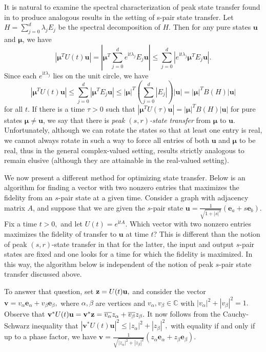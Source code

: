 \documentclass{article}
\numberwithin{equation}{section}
\newcommand{\be}{\mathbf e}
\newcommand{\bu}{\mathbf u}
\newcommand{\bv}{\mathbf v}
\newcommand{\bmu}{{\boldsymbol{\mu}}}
\def\C{\mathbb{C}}
\def\ii{\mathrm{i}}
\begin{document}
{It is natural to examine the spectral characterization of peak state transfer found in \cite{coutinho2019perfect} to produce analogous results in the setting of s-pair state transfer. Let %
$H =\sum_{j=0}^d\lambda_j E_j$ be the spectral decomposition of $H$. Then for any 
pure states $\bu$ and $\bmu$, we have 
\begin{equation*}
\left|\bmu^TU(t)\bu\right|= \left|\bmu^T\sum_{j=0}^de^{\ii t\lambda_j}E_j\bu\right|\leq \sum_{j=0}^d\left|e^{\ii t\lambda_j}\bmu^TE_j\bu\right|.
\end{equation*}
Since each $e^{\ii t\lambda_j}$ lies on the unit circle, we have 
\begin{equation*}
\left|\bmu^TU(t)\bu\right|\leq \sum_{j=0}^d\left|\bmu^TE_j\bu\right|\leq|\bmu|^T\left(\sum_{j=0}^d\left|E_j\right|\right)|\bu|=|\bmu|^TB(H)|\bu|
\end{equation*}
for all $t$. If there is a time $\tau>0$ such that  $|\bmu^TU(\tau)\bu|=|\bmu|^TB(H)|\bu|$ for pure states $\bmu\neq \bu$, we say that there is \emph{peak $(s,r)$-state transfer} from $\bmu$ to $\bu$. Unfortunately, although we can rotate the states so that at least one entry is real, we cannot always rotate in such a way to force all entries of both $\bu$ and $\bmu$ to be real, thus in the general complex-valued setting, results strictly analogous to \cite{coutinho2025peak} remain elusive (although they are attainable in the real-valued setting).  



We now present a different method for optimizing state transfer. Below is an algorithm for finding a vector with two nonzero entries that maximizes the fidelity from an $s$-pair state at a given time. 
Consider a graph with adjacency matrix $A$, and suppose that we are given the $s$-pair state $\bu= \frac{1}{\sqrt{1+|s|^2}}(\be_a+s\be_b)$. Fix a time $t>0,$ and let $U(t)=e^{\ii tA}.$ Which vector with two nonzero entries maximizes the fidelity of transfer to $\bu$ at time $t$? This is different than the notion of peak $(s,r)$-state transfer in that for the latter, the input and output $s$-pair states are fixed and one looks for a time for which the fidelity is maximized. In this way, the algorithm below is independent of the notion of peak $s$-pair state transfer discussed above. 

To answer that question, set ${\bf{z}}=U(t)\bu, $ and consider the vector $\bv=v_\alpha \be_\alpha +v_\beta \be_\beta,   $
where $\alpha, \beta$ are vertices and $v_\alpha, v_\beta \in \C$ with $|v_\alpha|^2+ |v_\beta|^2=1. $ Observe that $\bv^*U(t)\bu = \bv^* {\bf{z}} = \overline{v_\alpha} z_\alpha + \overline{v_\beta} z_\beta.  $ It now follows from the Cauchy-Schwarz inequality that $|\bv^*U(t)\bu|^2 \le |z_\alpha|^2+ |z_\beta|^2 ,$ with equality if and only if up to a phase factor, we have $\bv=\frac{1}{\sqrt{|z_\alpha|^2+ |z_\beta|^2}}  (z_\alpha \be_\alpha +z_\beta \be_\beta).$ 



}
\end{document}
